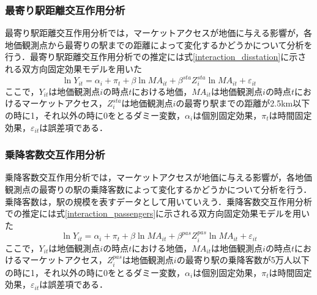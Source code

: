 \subsubsection{最寄り駅距離交互作用分析}
最寄り駅距離交互作用分析では，マーケットアクセスが地価に与える影響が，各地価観測点から最寄りの駅までの距離によって変化するかどうかについて分析を行う．最寄り駅距離交互作用分析での推定には式\ref{interaction_disstation}に示される双方向固定効果モデルを用いた
\begin{equation}
  \ln{Y_{it}} = \alpha_{i} + \pi_{t} + \beta\ln{MA_{it}} + \beta^{sta}Z^{sta}_{i}\ln{MA_{it}} + \varepsilon_{it}
  \label{interaction_disstation}
\end{equation}
ここで，$Y_{it}$は地価観測点$i$の時点$t$における地価，$MA_{it}$は地価観測点$i$の時点$t$におけるマーケットアクセス，$Z^{sta}_{i}$は地価観測点$i$の最寄り駅までの距離が2.5km以下の時に1，それ以外の時に0をとるダミー変数，$\alpha_{i}$は個別固定効果，$\pi_{t}$は時間固定効果，$\varepsilon_{it}$は誤差項である．

\subsubsection{乗降客数交互作用分析}
乗降客数交互作用分析では，マーケットアクセスが地価に与える影響が，各地価観測点の最寄りの駅の乗降客数によって変化するかどうかについて分析を行う．乗降客数は，駅の規模を表すデータとして用いていえう．乗降客数交互作用分析での推定には式\ref{interaction_passengers}に示される双方向固定効果モデルを用いた
\begin{equation}
  \ln{Y_{it}} = \alpha_{i} + \pi_{t} + \beta\ln{MA_{it}} + \beta^{pas}Z^{pas}_{i}\ln{MA_{it}} + \varepsilon_{it}
  \label{interaction_passengers}
\end{equation}
ここで，$Y_{it}$は地価観測点$i$の時点$t$における地価，$MA_{it}$は地価観測点$i$の時点$t$におけるマーケットアクセス，$Z^{pas}_{i}$は地価観測点$i$の最寄り駅の乗降客数が5万人以下の時に1，それ以外の時に0をとるダミー変数，$\alpha_{i}$は個別固定効果，$\pi_{t}$は時間固定効果，$\varepsilon_{it}$は誤差項である．

